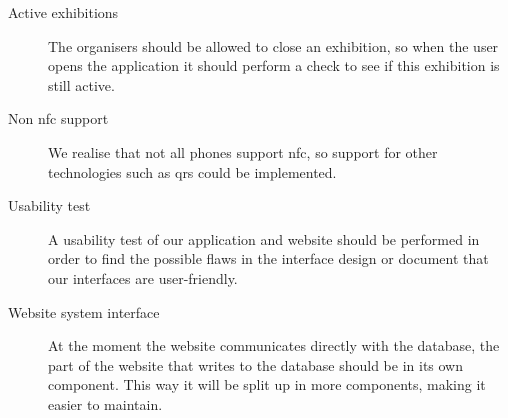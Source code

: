 \begin{description}
\item[Active exhibitions] The organisers should be allowed to close an exhibition, so when the user opens the application it should perform a check to see if this exhibition is still active.
\item[Non \ac{nfc} support] We realise that not all phones support \ac{nfc}, so support for other technologies such as \acp{qr} could be implemented.
\item[Usability test] A usability test of our application and website should be performed in order to find the possible flaws in the interface design or document that our interfaces are user-friendly.
\item[Website system interface] At the moment the website communicates directly with the database, the part of the website that writes to the database should be in its own component. This way it will be split up in more components, making it easier to maintain.
\end{description}

